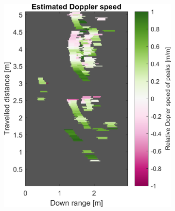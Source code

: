 \begin{figure}[htbp]
\begin{subfigure}[t]{0.475\linewidth}
        \includegraphics[width=\linewidth,max height=.475\textheight]{gfx/results/washroom_doppler.png}
    \end{subfigure}\bigskip\\
    \begin{subfigure}[t]{0.475\linewidth}  
        \centering 

\end{subfigure}
\end{figure}
